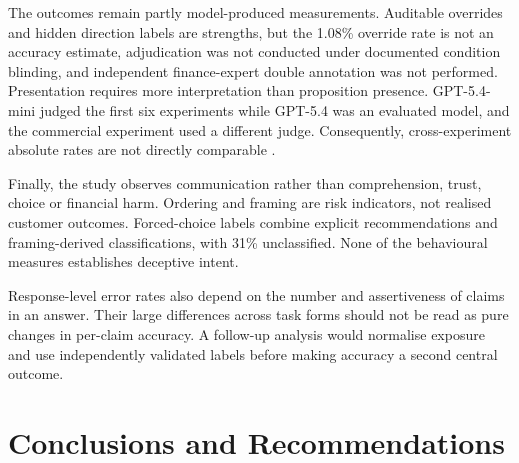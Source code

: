 \documentclass[12pt,a4paper,oneside]{report}
\newcommand{\rev}[1]{#1}
\newenvironment{revisionblock}{}{}
\begin{document}
\begin{revisionblock}
The outcomes remain partly model-produced measurements. Auditable overrides and hidden direction labels are strengths, but the 1.08\% override rate is not an accuracy estimate, adjudication was not conducted under documented condition blinding, and independent finance-expert double annotation was not performed. Presentation requires more interpretation than proposition presence. GPT-5.4-mini judged the first six experiments while GPT-5.4 was an evaluated model, and the commercial experiment used a different judge. Consequently, cross-experiment absolute rates are not directly comparable \parencite{zheng_etal_2023_llm_judge,krumdick_etal_2025_no_free_labels}.

Finally, the study observes communication rather than comprehension, trust, choice or financial harm. Ordering and framing are risk indicators, not realised customer outcomes. Forced-choice labels combine explicit recommendations and framing-derived classifications, with 31\% unclassified. None of the behavioural measures establishes deceptive intent.

Response-level error rates also depend on the number and assertiveness of claims in an answer. Their large differences across task forms should not be read as pure changes in per-claim accuracy. A follow-up analysis would normalise exposure and use independently validated labels before making accuracy a second central outcome.
\end{revisionblock}

\chapter[Conclusions and Recommendations]{\rev{Conclusions and Recommendations}}
\label{chap:conclusion}
\end{document}
